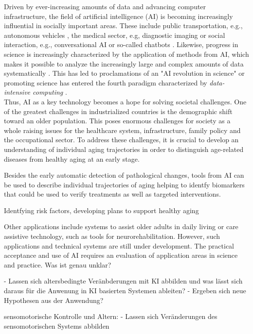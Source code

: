 Driven by ever-increasing amounts of data and advancing computer infrastructure, the field of artificial intelligence (AI) is becoming increasingly influential in socially important areas. These include public transportation, e.g., autonomous vehicles \cite{Leonard2020}, the medical sector, e.g, diagnostic imaging \cite{Liu2020} or social interaction, e.g., conversational AI or so-called chatbots \cite{Adamopoulou2020}. Likewise, progress in science is increasingly characterized by the application of methods from AI, which makes it possible to analyze the increasingly large and complex amounts of data systematically \cite{Brunton2019}. This has led to proclamations of an "AI revolution in science" \cite{Appenzeller2017} or promoting science has entered the fourth paradigm characterized by \textit{data-intensive computing} \cite{Hey2009}.\\
Thus, AI as a key technology becomes a hope for solving societal challenges. One of the greatest challenges in industrialized countries is the demographic shift toward an older population. This poses enormous challenges for society as a whole raising issues for the healthcare system, infrastructure, family policy and the occupational sector. To address these challenges, it is crucial to develop an understanding of individual aging trajectories in order to distinguish age-related diseases from healthy aging at an early stage. 

Besides the early automatic detection of pathological changes, tools from AI can be used to describe individual trajectories of aging helping to identfy biomarkers that could be used to verify treatments as well as targeted interventions.



Identfying risk factors, developing plans to support healthy aging 

 Other applications include systems to assist older adults in daily living or care assistive technology, such as tools for neurorehabilitation. However, such applications and technical systems are still under development. The practical acceptance and use of AI requires an evaluation of application areas in science and practice. 
Was ist genau unklar? 


- Lassen sich altersbedingte Veränbderungen mit KI abbilden und was lässt sich daraus für die Anwenung in KI basierten Systemen ableiten? 
- Ergeben sich neue Hypothesen aus der Anwendung? 


sensomotorische Kontrolle und Altern: 
- Lassen sich Veränderungen des sensomotorischen Systems abbilden 

